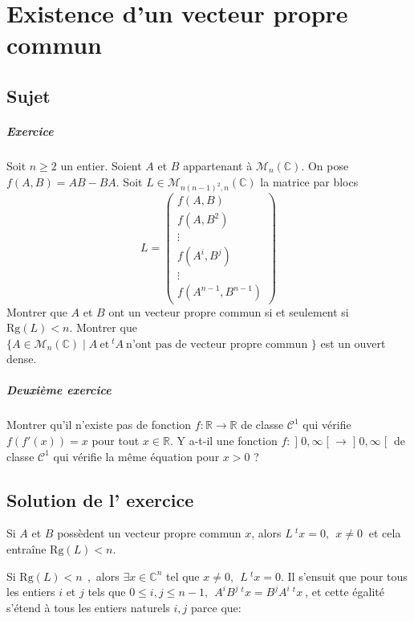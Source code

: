 \chapter{Existence d'un vecteur propre commun}


\section{Sujet}
\paragraph{ Exercice}
Soit $n\geqslant 2$ un entier.  Soient $A$ et $B$ appartenant à $\mathcal M_n (\mathbb C)$. On pose $f(A,B)= AB-BA.$ 
Soit $L \in \mathcal M_{n(n-1)^2,n} (\mathbb C)$  la matrice par blocs 
$$L = \begin{pmatrix} f(A,B) \\ f(A,B^2)\\ \vdots \\ f(A^{i},B^j)\\ \vdots \\ f(A^{n-1}, B^{n-1}) \end{pmatrix}$$ 
Montrer que $A$ et $B$ ont un vecteur propre commun si et seulement si $\text{Rg}(L)<n.$
Montrer que $\{A \in \mathcal M_n(\mathbb C) \mid A\:\text{et}\: ^tA\: \text{n'ont pas de vecteur propre commun }\}$ est un ouvert dense.
\paragraph{Deuxième exercice}
Montrer qu'il n'existe pas de fonction $f : \mathbb R \to \mathbb R$ de classe $\mathscr C^1$ qui vérifie $f(f'(x)) = x$ pour tout $x \in \mathbb R$.
Y a-t-il une fonction $f : \mathopen]0,\infty\mathclose[ \to \mathopen]0,\infty\mathclose[$ de classe $\mathscr C^1$ qui vérifie la même équation pour $x > 0$ ?
\section{Solution de l' exercice}%

 Si $A$ et $B$ possèdent un vecteur propre commun $x$, alors $L\:^tx =0, \:\: x\neq 0 \:$ et cela entraîne $\text{Rg}(L)<n.$
 
 Si $\text{Rg}(L)<n\:\:,$ alors $\exists x \in \mathbb C^n$ tel que  $x\neq 0,\:\:L\:^tx = 0.$ 
 Il s'ensuit que pour tous les entiers $i$ et $j$ tels que $0\leqslant i,j \leqslant n-1, \:\: A^{i}B^j \:^tx = B^j A^{i}\: ^tx\:$, et cette égalité s'étend à tous les entiers naturels $i,j$ parce que:
 
